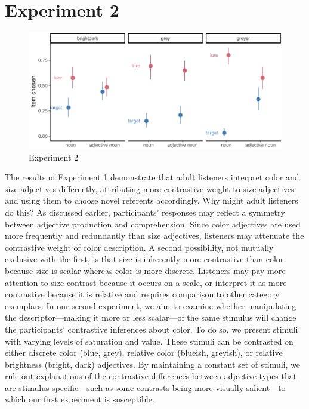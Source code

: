 \documentclass[10pt, letterpaper]{article}
\newenvironment{CodeChunk}{}{}
\begin{document}
\section{Experiment 2}\label{experiment-2}

\begin{CodeChunk}
\begin{figure}[tb]

{\centering \includegraphics{figs/e2_fig-1} 

}

\caption[Experiment 2]{Experiment 2}\label{fig:e2_fig}
\end{figure}
\end{CodeChunk}

The results of Experiment 1 demonstrate that adult listeners interpret
color and size adjectives differently, attributing more contrastive
weight to size adjectives and using them to choose novel referents
accordingly. Why might adult listeners do this? As discussed earlier,
participants' responses may reflect a symmetry between adjective
production and comprehension. Since color adjectives are used more
frequently and redundantly than size adjectives, listeners may attenuate
the contrastive weight of color description. A second possibility, not
mutually exclusive with the first, is that size is inherently more
contrastive than color because size is scalar whereas color is more
discrete. Listeners may pay more attention to size contrast because it
occurs on a scale, or interpret it as more contrastive because it is
relative and requires comparison to other category exemplars. In our
second experiment, we aim to examine whether manipulating the
descriptor---making it more or less scalar---of the same stimulus will
change the participants' contrastive inferences about color. To do so,
we present stimuli with varying levels of saturation and value. These
stimuli can be contrasted on either discrete color (blue, grey),
relative color (blueish, greyish), or relative brightness (bright, dark)
adjectives. By maintaining a constant set of stimuli, we rule out
explanations of the contrastive differences between adjective types that
are stimulus-specific---such as some contrasts being more visually
salient---to which our first experiment is susceptible.
\end{document}
